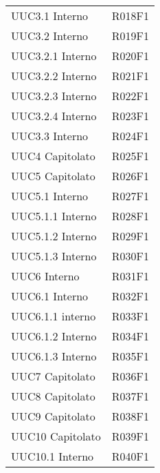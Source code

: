 \documentclass[../analisi-dei-requisiti.tex]{subfiles}
\begin{document}
\begin{longtable}[H]{ p{4cm} | p{4cm} }
  UUC3.1 Interno                & R018F1                               \\
  UUC3.2 Interno                & R019F1                               \\
  UUC3.2.1 Interno              & R020F1                               \\
  UUC3.2.2 Interno              & R021F1                               \\
  UUC3.2.3 Interno              & R022F1                               \\
  UUC3.2.4 Interno              & R023F1                               \\
  UUC3.3 Interno                & R024F1                               \\
  UUC4 Capitolato               & R025F1                               \\
  UUC5 Capitolato               & R026F1                               \\
  UUC5.1 Interno                & R027F1                               \\
  UUC5.1.1 Interno              & R028F1                               \\
  UUC5.1.2 Interno              & R029F1                               \\
  UUC5.1.3 Interno              & R030F1                               \\
  UUC6 Interno                  & R031F1                               \\
  UUC6.1 Interno                & R032F1                               \\
  UUC6.1.1 interno              & R033F1                               \\
  UUC6.1.2 Interno              & R034F1                               \\
  UUC6.1.3 Interno              & R035F1                               \\
  UUC7 Capitolato               & R036F1                               \\
  UUC8 Capitolato               & R037F1                               \\
  UUC9 Capitolato               & R038F1                               \\
  UUC10 Capitolato              & R039F1                               \\
  UUC10.1 Interno               & R040F1                               \\

\end{longtable}
\end{document}
